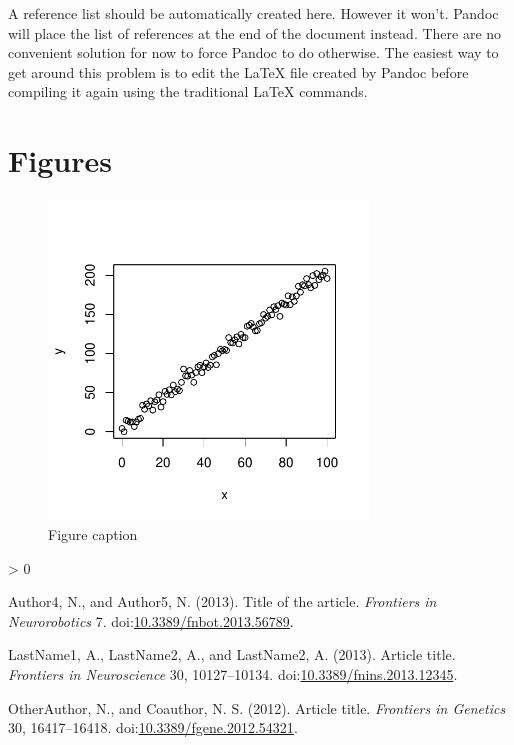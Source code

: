 \documentclass[utf8]{frontiersSCNS}
\newlength{\cslhangindent}
\newenvironment{CSLReferences}[2] %
 {%
  \setlength{\parindent}{0pt}
  \ifodd #1 \everypar{\setlength{\hangindent}{\cslhangindent}}\ignorespaces\fi
  \ifnum #2 > 0
  \setlength{\parskip}{#2\baselineskip}
  \fi
 }%
 {}
\begin{document}
A reference list should be automatically created here. However it won't.
Pandoc will place the list of references at the end of the document
instead. There are no convenient solution for now to force Pandoc to do
otherwise. The easiest way to get around this problem is to edit the
LaTeX file created by Pandoc before compiling it again using the
traditional LaTeX commands.

\hypertarget{figures}{%
\section*{Figures}\label{figures}}

\begin{figure}

{\centering \includegraphics[width=85mm,height=85mm]{Frontiers_files/figure-latex/Figure-1-1} 

}

\caption{Figure caption}\label{fig:Figure-1}
\end{figure}

\hypertarget{refs}{}
\begin{CSLReferences}{1}{0}
\leavevmode\hypertarget{ref-Neurobot2013}{}%
Author4, N., and Author5, N. (2013). Title of the article.
\emph{Frontiers in Neurorobotics} 7.
doi:\href{https://doi.org/10.3389/fnbot.2013.56789}{10.3389/fnbot.2013.56789}.

\leavevmode\hypertarget{ref-Neuro2013}{}%
LastName1, A., LastName2, A., and LastName2, A. (2013). Article title.
\emph{Frontiers in Neuroscience} 30, 10127--10134.
doi:\href{https://doi.org/10.3389/fnins.2013.12345}{10.3389/fnins.2013.12345}.

\leavevmode\hypertarget{ref-Gene2012}{}%
OtherAuthor, N., and Coauthor, N. S. (2012). Article title.
\emph{Frontiers in Genetics} 30, 16417--16418.
doi:\href{https://doi.org/10.3389/fgene.2012.54321}{10.3389/fgene.2012.54321}.

\end{CSLReferences}
\end{document}
